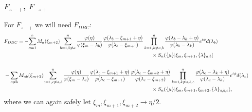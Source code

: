 \documentclass[a4paper,10pt]{article}
\begin{document}
\subsubsection{$F_{z-+}$, $F_{-z+}$}
For $F_{z-+}$ we will need $F_{DBC}$:
\begin{equation}
\begin{aligned}
&F_{ {\color{black}{ D }} B  {\color{black}{C}} } =
 -{\color{black}{ \sum_{a=1}^n M_a(\xi_{m+2}) }}   {\color{black}{\sum_{b=1,b\neq a}^{n} \frac{\varphi(\eta)}{\varphi(\xi_m-\lambda_b)} 
\frac{\varphi(\lambda_b-\xi_{m+1}+\eta)}{\varphi(\lambda_b-\xi_{m+1})}
\prod_{k=1,k\neq a,b}^{n} \frac{\varphi(\lambda_b-\lambda_k+\eta)}{\varphi(\lambda_b-\lambda_k)} {\color{black} e^{i\phi}} d(\lambda_b) }} \\
& \hspace*{10cm}
\times
S_n(\{\mu\}|\xi_{m},\xi_{m+1},\{\lambda\}_{a,b})\\
\\
%
&- {\color{black}{ \sum_{a\neq b} M_{ab}(\xi_{m+2})  }} {\color{black}{\sum_{c=1,c\neq a,b}^{n} \frac{\varphi(\eta)}{\varphi(\xi_m-\lambda_c)}
% 
\frac{\varphi(\lambda_c-\xi_{m+1}+\eta)}{\varphi(\lambda_c-\xi_{m+1})} 
\frac{\varphi(\lambda_c-\xi_{m+2}+\eta)}{\varphi(\lambda_c-\xi_{m+2})} 
%
\prod_{k=1,k\neq a,b,c}^{n} \frac{\varphi(\lambda_c-\lambda_k+\eta)}{\varphi(\lambda_c-\lambda_k)} {\color{black} e^{i\phi}} d(\lambda_c) }} \\
& \hspace*{10cm}
\times
S_n(\{\mu\}|\xi_{m},\xi_{m+1},\xi_{m+2},\{\lambda\}_{a,b,c}),\\
%
\end{aligned}
\end{equation}
where we can again safely let $\xi_m,\xi_{m+1},\xi_{m+2}\rightarrow \eta/2$. 
\end{document}
